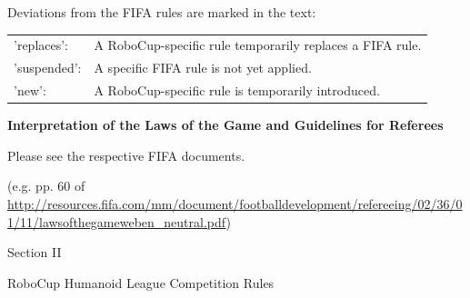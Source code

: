 \documentclass[a4paper]{article}
\newcommand{\simplify}[1]{#1}
\begin{document}
\bigskip

Deviations from the FIFA rules are marked in the text:

\bigskip
\begin{tabular}{ll}
'replaces': &A RoboCup-specific rule temporarily replaces a FIFA rule. \\
'suspended': &A specific FIFA rule is not yet applied. \\
'new': &A RoboCup-specific rule is temporarily introduced.
\end{tabular}




\clearpage











\simplify{}


\simplify{}








\bigskip


\bigskip

\clearpage
{\Huge{\bfseries
Interpretation of the Laws of the Game and Guidelines for Referees}

\vspace*{1.5cm}

{\Large
Please see the respective FIFA documents.}}

{\scriptsize 	
(e.g. pp. 60 of
\url{http://resources.fifa.com/mm/document/footballdevelopment/refereeing/02/36/01/11/lawsofthegameweben_neutral.pdf})}




\clearpage

\begin{center}
\Huge\bfseries{
\vspace*{3cm}
Section II

\vspace*{2cm}

RoboCup Humanoid League Competition Rules}
\end{center}
\end{document}
